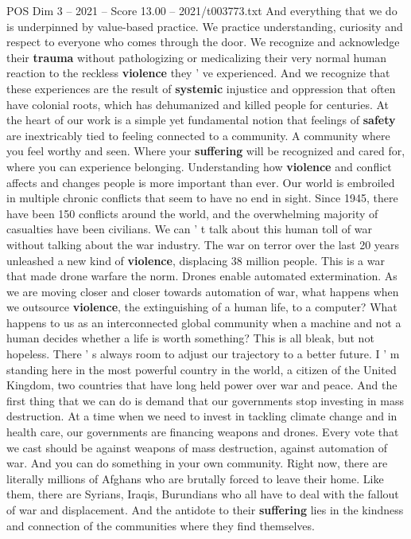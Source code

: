 \begin{textsample}{POS Dim 3 – 2021 – Score 13.00 – 2021/t003773.txt}
And everything that we do is underpinned by value-based practice.
We practice understanding, curiosity and respect to everyone who comes through the door.
We recognize and acknowledge their \textbf{trauma} without pathologizing or medicalizing their very normal human reaction to the reckless \textbf{violence} they ' ve experienced.
And we recognize that these experiences are the result of \textbf{systemic} injustice and oppression that often have colonial roots, which has dehumanized and killed people for centuries.
At the heart of our work is a simple yet fundamental notion that feelings of \textbf{safety} are inextricably tied to feeling connected to a community.
A community where you feel worthy and seen.
Where your \textbf{suffering} will be recognized and cared for, where you can experience belonging.
Understanding how \textbf{violence} and conflict affects and changes people is more important than ever.
Our world is embroiled in multiple chronic conflicts that seem to have no end in sight.
Since 1945, there have been 150 conflicts around the world, and the overwhelming majority of casualties have been civilians.
We can ' t talk about this human toll of war without talking about the war industry.
The war on terror over the last 20 years unleashed a new kind of \textbf{violence}, displacing 38 million people.
This is a war that made drone warfare the norm.
Drones enable automated extermination.
As we are moving closer and closer towards automation of war, what happens when we outsource \textbf{violence}, the extinguishing of a human life, to a computer?
What happens to us as an interconnected global community when a machine and not a human decides whether a life is worth something?
This is all bleak, but not hopeless.
There ' s always room to adjust our trajectory to a better future.
I ' m standing here in the most powerful country in the world, a citizen of the United Kingdom, two countries that have long held power over war and peace.
And the first thing that we can do is demand that our governments stop investing in mass destruction.
At a time when we need to invest in tackling climate change and in health care, our governments are financing weapons and drones.
Every vote that we cast should be against weapons of mass destruction, against automation of war.
And you can do something in your own community.
Right now, there are literally millions of Afghans who are brutally forced to leave their home.
Like them, there are Syrians, Iraqis, Burundians who all have to deal with the fallout of war and displacement.
And the antidote to their \textbf{suffering} lies in the kindness and connection of the communities where they find themselves.

\end{textsample}

